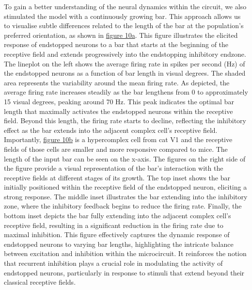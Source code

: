\documentclass[12pt]{article}
\begin{document}
To gain a better understanding of the neural dynamics within the circuit, we also stimulated the model with a continuously growing bar. This approach allows us to visualise subtle differences related to the length of the bar at the population's preferred orientation, as shown in \hyperref[fig:endstopping_length]{figure 10a}. This figure illustrates the elicited response of endstopped neurons to a bar that starts at the beginning of the receptive field and extends progressively into the endstopping inhibitory endzone. The lineplot on the left shows the average firing rate in spikes per second (Hz) of the endstopped neurons as a function of bar length in visual degrees. The shaded area represents the variability around the mean firing rate. As depicted, the average firing rate increases steadily as the bar lengthens from 0 to approximately 15 visual degrees, peaking around 70 Hz. This peak indicates the optimal bar length that maximally activates the endstopped neurons within the receptive field. Beyond this length, the firing rate starts to decline, reflecting the inhibitory effect as the bar extends into the adjacent complex cell's receptive field. Importantly, \hyperref[fig:endstopping_length]{figure 10b} is a hypercomplex cell from cat V1 and the receptive fields of those cells are smaller and more responsive compared to mice. The length of the input bar can be seen on the x-axis. The figures on the right side of the figure provide a visual representation of the bar's interaction with the receptive fields at different stages of its growth. The top inset shows the bar initially positioned within the receptive field of the endstopped neuron, eliciting a strong response. The middle inset illustrates the bar extending into the inhibitory zone, where the inhibitory feedback begins to reduce the firing rate. Finally, the bottom inset depicts the bar fully extending into the adjacent complex cell's receptive field, resulting in a significant reduction in the firing rate due to maximal inhibition. This figure effectively captures the dynamic response of endstopped neurons to varying bar lengths, highlighting the intricate balance between excitation and inhibition within the microcircuit. It reinforces the notion that recurrent inhibition plays a crucial role in modulating the activity of endstopped neurons, particularly in response to stimuli that extend beyond their classical receptive fields.
\end{document}
